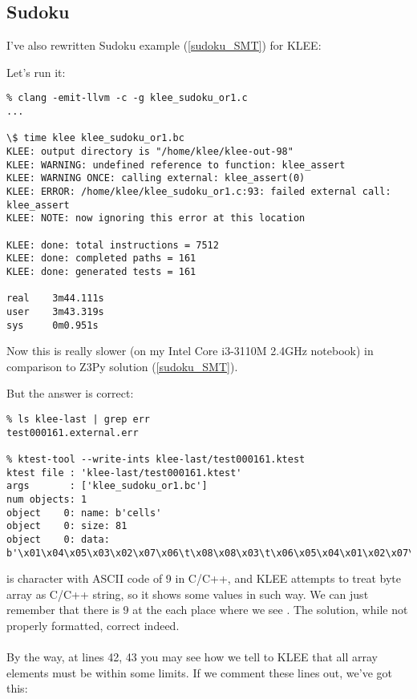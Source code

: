 \subsection{Sudoku}

I've also rewritten Sudoku example (\ref{sudoku_SMT}) for KLEE:



Let's run it:

\begin{lstlisting}
% clang -emit-llvm -c -g klee_sudoku_or1.c
...

\$ time klee klee_sudoku_or1.bc
KLEE: output directory is "/home/klee/klee-out-98"
KLEE: WARNING: undefined reference to function: klee_assert
KLEE: WARNING ONCE: calling external: klee_assert(0)
KLEE: ERROR: /home/klee/klee_sudoku_or1.c:93: failed external call: klee_assert
KLEE: NOTE: now ignoring this error at this location

KLEE: done: total instructions = 7512
KLEE: done: completed paths = 161
KLEE: done: generated tests = 161

real    3m44.111s
user    3m43.319s
sys     0m0.951s
\end{lstlisting}

Now this is really slower (on my Intel Core i3-3110M 2.4GHz notebook) in comparison to Z3Py solution (\ref{sudoku_SMT}).

But the answer is correct:

\begin{lstlisting}
% ls klee-last | grep err
test000161.external.err

% ktest-tool --write-ints klee-last/test000161.ktest
ktest file : 'klee-last/test000161.ktest'
args       : ['klee_sudoku_or1.bc']
num objects: 1
object    0: name: b'cells'
object    0: size: 81
object    0: data: b'\x01\x04\x05\x03\x02\x07\x06\t\x08\x08\x03\t\x06\x05\x04\x01\x02\x07\x06\x07\x02\t\x01\x08\x05\x04\x03\x04\t\x06\x01\x08\x05\x03\x07\x02\x02\x01\x08\x04\x07\x03\t\x05\x06\x07\x05\x03\x02\t\x06\x04\x08\x01\x03\x06\x07\x05\x04\x02\x08\x01\t\t\x08\x04\x07\x06\x01\x02\x03\x05\x05\x02\x01\x08\x03\t\x07\x06\x04'
\end{lstlisting}

 is character with ASCII code of 9 in C/C++, and KLEE attempts to treat byte array as C/C++ string, so it shows some values in such way.
We can just remember that there is 9 at the each place where we see .
The solution, while not properly formatted, correct indeed. \\
\\
By the way, at lines 42, 43 you may see how we tell to KLEE that all array elements must be within some limits.
If we comment these lines out, we've got this:

